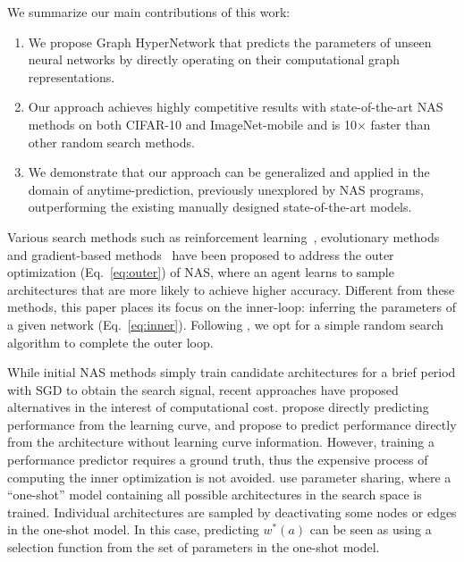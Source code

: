 \documentclass{article} %
\begin{document}
We summarize our main contributions of this work:
\vspace{-0.1cm}\begin{enumerate}
\setlength{\itemsep}{1pt}
\item We propose Graph HyperNetwork that predicts the parameters of unseen neural networks by
directly operating on their computational graph representations.
\item Our approach achieves highly competitive results with state-of-the-art NAS methods on both
CIFAR-10 and ImageNet-mobile and is 10$\times$ faster than other random search methods.
\item We demonstrate that our approach can be generalized and applied in the domain of
anytime-prediction, previously unexplored by NAS programs, outperforming the existing manually
designed state-of-the-art models.
\end{enumerate}
Various search methods such as reinforcement learning~\citep{zoph2016neural,
baker2016designing,zoph2017learning}, evolutionary
methods~\citep{real2017large,miikkulainen2017evolving,xie2017genetic,liu2017hierarchical,real2018regularized}
and gradient-based methods~\citep{liu2018darts,luo2018neural} have been proposed to address the
outer optimization (Eq.~\ref{eq:outer}) of NAS, where an agent learns to sample architectures that
are more likely to achieve higher accuracy. Different from these methods, this paper places its
focus on the inner-loop: inferring the parameters of a given network (Eq.~\ref{eq:inner}). Following
\cite{brock2017smash,bender2018understanding}, we opt for a simple random search algorithm to
complete the outer loop.

While initial NAS methods simply train candidate architectures for a brief period with SGD to obtain
the search signal, recent approaches have proposed alternatives in the interest of computational
cost. \cite{baker2017accelerating} propose directly predicting performance from the learning curve,
and \cite{deng2017peephole} propose to predict performance directly from the architecture without
learning curve information. However, training a performance predictor requires a ground truth, thus
the expensive process of computing the inner optimization is not avoided.
\cite{pham2018efficient,bender2018understanding,liu2018darts} use parameter sharing, where a
``one-shot'' model containing all possible architectures in the search space is trained. Individual
architectures are sampled by deactivating some nodes or edges in the one-shot model. In this case,
predicting $w^*(a)$ can be seen as using a selection function from the set of parameters in the
one-shot model.
\end{document}
